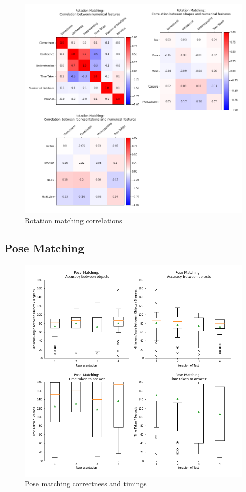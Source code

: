 \documentclass{l4proj}
\begin{document}
\begin{figure}[H]
  \includegraphics[width=\textwidth]{images/results/rotation_matching_correlations.png}
  \caption{Rotation matching correlations}
  \label{fig:shape_corr}
\end{figure}

\subsection*{Pose Matching}

\begin{figure}[H]
  \includegraphics[width=\textwidth]{images/results/pose_matching_stats.png}
  \caption{Pose matching correctness and timings}
  \label{fig:shape_stats}
\end{figure}
\end{document}
